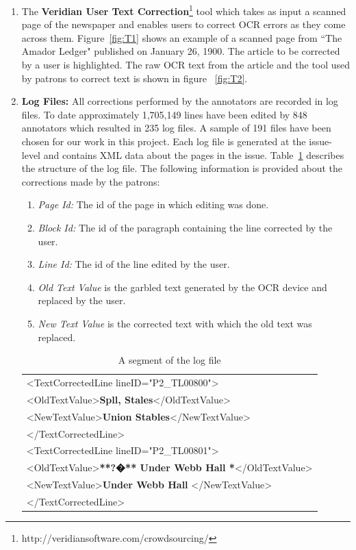 \documentclass[letterpaper]{article}
\begin{document}
\begin{enumerate}


\item The \textbf{Veridian User Text Correction}\footnote{http://veridiansoftware.com/crowdsourcing/} tool which takes as input a scanned page of the newspaper and enables users to correct OCR errors as they come across them.
Figure~\ref{fig:T1} shows an example of a scanned page from ``The Amador Ledger" published on January 26, 1900. The article to be corrected by a user is highlighted. The raw OCR text from the article and the tool used by patrons to correct text is shown in figure ~\ref{fig:T2}.

\item \textbf{Log Files: }All corrections performed by the annotators are recorded in log files. To date approximately 1,705,149 lines have been edited by 848 annotators which resulted in 235 log files. A sample of 191 files have been chosen for our work in this project. Each log file is generated at the issue-level and contains XML data about the pages in the issue. Table~\ref{table:logfile} describes the structure of the log file. The following information is provided about the corrections made by the patrons:
\begin{enumerate}
\item \textit{Page Id: } The id of the page in which editing was done.
\item \textit{Block Id: } The id of the paragraph containing the line corrected by the user.
\item \textit{Line Id: }The id of the line edited by the user.
\item \textit{Old Text Value} is the garbled text generated by the OCR device and replaced by the user.
\item \textit{New Text Value} is the corrected text with which the old text was replaced.
\end{enumerate}

\begin{table}[h]
\begin{center}
\begin{tabular}{l}
\textless TextCorrectedLine lineID="P2\_TL00800"\textgreater \\
\textless OldTextValue\textgreater \textbf{Spll, Stales}\textless /OldTextValue\textgreater \\
\textless NewTextValue\textgreater \textbf{Union Stables}\textless /NewTextValue\textgreater \\
\textless /TextCorrectedLine\textgreater \\
\textless TextCorrectedLine lineID="P2\_TL00801"\textgreater \\
\textless OldTextValue\textgreater \textbf{**?�** Under Webb Hall *}\textless/OldTextValue\textgreater \\
\textless NewTextValue\textgreater \textbf{Under Webb Hall} \textless/NewTextValue\textgreater \\
\textless /TextCorrectedLine\textgreater \\
\end{tabular}
\end{center}
\caption{A segment of the log file}
\label{table:logfile}
\end{table}


\end{enumerate}
\end{document}
